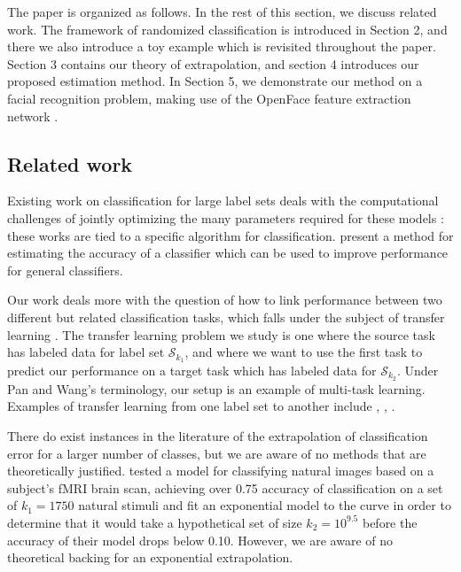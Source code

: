 \documentclass[twoside,11pt]{article}
\begin{document}
The paper is organized as follows.  In the rest of this section, we discuss related work.  The framework of randomized classification is introduced in Section 2, and there we also introduce a toy example which is revisited throughout the paper. Section 3 contains our theory of extrapolation, and section 4 introduces our proposed estimation method.  In Section 5, we demonstrate our method on a facial recognition problem, making use of the OpenFace feature extraction network \cite{amos2016openface}.



\subsection{Related work}

Existing work on classification for large label sets deals with the computational challenges of jointly optimizing the many parameters required for these models \citep{crammer2001algorithmic, lee2004multicategory, weston1999support}: these works are tied to a specific algorithm for classification.  \cite{gupta2014training} present a method for estimating the accuracy of a classifier which can be used to improve performance for general classifiers.

Our work deals more with the question of how to link performance between two different but related classification tasks, which falls under the subject of transfer learning \citep{pan2010survey}.
The transfer learning problem we study is one where the source task has labeled data for label set $\mathcal{S}_{k_1}$, and where we want to use the first task to predict our performance on a target task which has labeled data for $\mathcal{S}_{k_2}$.  Under Pan and Wang's terminology, our setup is an example of multi-task learning.  Examples of transfer learning from one label set to another include  \cite{oquab2014learning}, \cite{donahue2014decaf}, \cite{sharif2014cnn}.

There do exist instances in the literature of the extrapolation of classification error for a larger number of classes, but we are aware of no methods that are theoretically justified.  \cite{Kay2008a} tested a model for classifying natural images based on a subject's fMRI brain scan, achieving over 0.75 accuracy of classification on a set of $k_1 = 1750$ natural stimuli and fit an exponential model to the curve in order to determine that it would take a hypothetical set of size $k_2 = 10^{9.5}$ before the accuracy of their model drops below 0.10.  However, we are aware of no theoretical backing for an exponential extrapolation.
\end{document}
